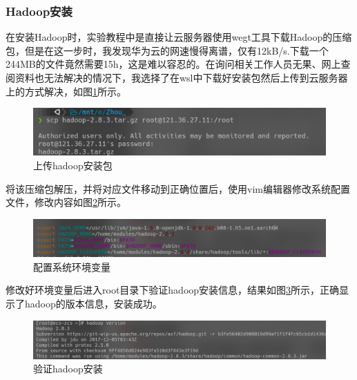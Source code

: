 \documentclass{../source/zjureport}
\begin{document}
            \subsubsection{Hadoop安装}
                在安装Hadoop时，实验教程中是直接让云服务器使用wegt工具下载Hadoop的压缩包，但是在这一步时，我发现华为云的网速慢得离谱，仅有12kB/s.下载一个244MB的文件竟然需要15h，这是难以容忍的。在询问相关工作人员无果、网上查阅资料也无法解决的情况下，我选择了在wsl中下载好安装包然后上传到云服务器上的方式解决，如图\ref{上传hadoop}所示。
                \begin{figure}[H]
                    \centering
                    \includegraphics[width = \textwidth]{figure/上传hadoop安装包.png}
                    \caption{上传hadoop安装包}
                    \label{上传hadoop}
                \end{figure}

                将该压缩包解压，并将对应文件移动到正确位置后，使用vim编辑器修改系统配置文件，修改内容如图\ref{修改配置文件}所示。
                \begin{figure}[H]
                    \centering
                    \includegraphics[width = \textwidth]{figure/配置系统环境变量.png}
                    \caption{配置系统环境变量}
                    \label{修改配置文件}
                \end{figure}

                修改好环境变量后进入root目录下验证hadoop安装信息，结果如图\ref{验证hadoop}所示，正确显示了hadoop的版本信息，安装成功。
                \begin{figure}[H]
                    \centering
                    \includegraphics[width = \textwidth]{figure/验证hadoop安装.png}
                    \caption{验证hadoop安装}
                    \label{验证hadoop}
                \end{figure}
\end{document}
